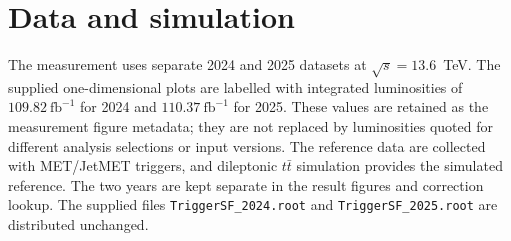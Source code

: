 \section{Data and simulation}\label{sec:data}
The measurement uses separate 2024 and 2025 datasets at $\sqrt{s}=13.6$~TeV.
The supplied one-dimensional plots are labelled with integrated luminosities of $109.82~\mathrm{fb}^{-1}$ for 2024 and $110.37~\mathrm{fb}^{-1}$ for 2025.
These values are retained as the measurement figure metadata; they are not replaced by luminosities quoted for different analysis selections or input versions.
The reference data are collected with MET/JetMET triggers, and dileptonic $t\bar t$ simulation provides the simulated reference.
The two years are kept separate in the result figures and correction lookup.
The supplied files \texttt{TriggerSF\_2024.root} and \texttt{TriggerSF\_2025.root} are distributed unchanged.
